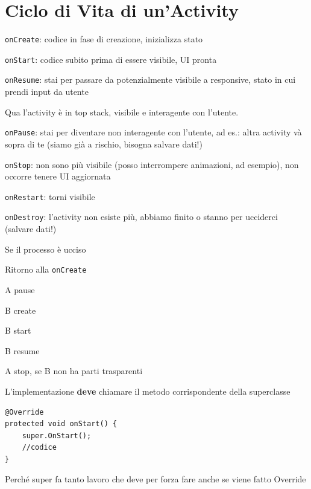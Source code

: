 \documentclass[10pt]{book}
\begin{document}
\section{Ciclo di Vita di un'Activity}
\begin{list}{}{Fase di avvio}
	\item \texttt{onCreate}: codice in fase di creazione, inizializza stato
	\item \texttt{onStart}: codice subito prima di essere visibile, UI pronta
	\item \texttt{onResume}: stai per passare da potenzialmente visibile a responsive, stato in cui prendi input da utente
\end{list}
Qua l'activity è in top stack, visibile e interagente con l'utente.
\begin{list}{}{}
	\item \texttt{onPause}: stai per diventare non interagente con l'utente, ad es.: altra activity và sopra di te (siamo già a rischio, bisogna salvare dati!)
	\item \texttt{onStop}: non sono più visibile (posso interrompere animazioni, ad esempio), non occorre tenere UI aggiornata
	\item \texttt{onRestart}: torni visibile
	\item \texttt{onDestroy}: l'activity non esiste più, abbiamo finito o stanno per ucciderci (salvare dati!)
\end{list}
Se il processo è ucciso
\begin{list}{}{}
	\item Ritorno alla \texttt{onCreate}
\end{list}
\begin{list}{}{Da A a B}
	\item A pause
	\item B create
	\item B start
	\item B resume
	\item A stop, se B non ha parti trasparenti
\end{list}
L'implementazione \textbf{deve} chiamare il metodo corrispondente della superclasse
\begin{verbatim}
@Override
protected void onStart() {
	super.OnStart();
	//codice
}
\end{verbatim}
Perché super fa tanto lavoro che deve per forza fare anche se viene fatto Override
\end{document}
